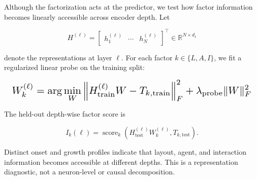 Although the factorization acts at the predictor, we test how factor information
becomes linearly accessible across encoder depth. Let

\begin{equation*}
H^{(\ell)}
=
\begin{bmatrix}
h_1^{(\ell)}&\cdots&h_N^{(\ell)}
\end{bmatrix}^{\!\top}
\in\mathbb{R}^{N\times d_\ell}
\end{equation*}

denote the representations at layer $\ell$. For each factor
$k\in\{L,A,I\}$, we fit a regularized linear probe on the training split:

\begin{equation*}
\resizebox{0.98\columnwidth}{!}{$\displaystyle
W_k^{(\ell)}
=
\arg\min_W
\left\|
H_{\mathrm{train}}^{(\ell)}W-T_{k,\mathrm{train}}
\right\|_F^2
+
\lambda_{\mathrm{probe}}\|W\|_F^2
$}
\end{equation*}

The held-out depth-wise factor score is

\begin{equation*}
I_k(\ell)
=
\operatorname{score}_k
\left(
H_{\mathrm{test}}^{(\ell)}W_k^{(\ell)},
T_{k,\mathrm{test}}
\right).
\end{equation*}

Distinct onset and growth profiles indicate that layout, agent, and interaction
information becomes accessible at different depths. This is a representation
diagnostic, not a neuron-level or causal decomposition.















































